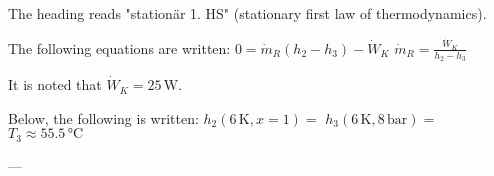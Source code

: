 The heading reads "stationär 1. HS" (stationary first law of thermodynamics).  

The following equations are written:  
\( 0 = \dot{m}_R (h_2 - h_3) - \dot{W}_K \)  
\( \dot{m}_R = \frac{\dot{W}_K}{h_2 - h_3} \)  

It is noted that \( \dot{W}_K = 25 \, \text{W} \).  

Below, the following is written:  
\( h_2 (6 \, \text{K}, x = 1) = \)  
\( h_3 (6 \, \text{K}, 8 \, \text{bar}) = \)  
\( T_3 \approx 55.5 \, \text{°C} \)  

---
